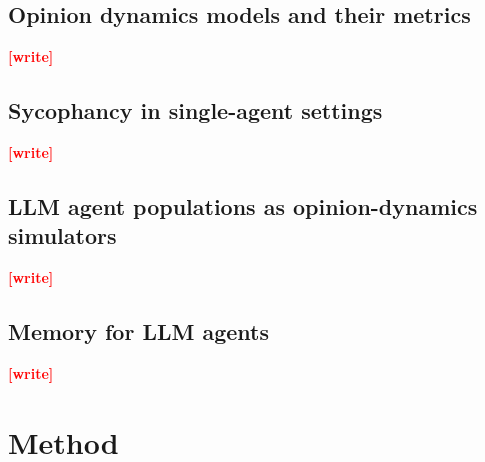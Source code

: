 \documentclass[11pt,a4paper]{article}
\newcommand{\pending}[1]{\textcolor{red}{\textbf{[#1]}}}   %
\begin{document}
\subsection{Opinion dynamics models and their metrics}\label{sec:related-od}
\pending{write}

\subsection{Sycophancy in single-agent settings}\label{sec:related-syco}
\pending{write}

\subsection{LLM agent populations as opinion-dynamics simulators}\label{sec:related-pop}
\pending{write}

\subsection{Memory for LLM agents}\label{sec:related-mem}
\pending{write}

\section{Method}\label{sec:method}
\end{document}
